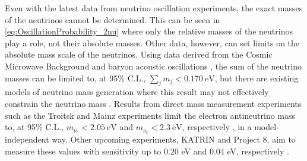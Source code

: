 Even with the latest data from neutrino oscillation experiments, the exact masses of the neutrinos cannot be determined.
This can be seen in \autoref{eq:OscillationProbability_2nu} where only the relative masses of the neutrinos play a role, not their absolute masses. 
Other data, however, can set limits on the absolute mass scale of the neutrinos.
Using data derived from the Cosmic Microwave Background and baryon acoustic oscillations \cite{refId0}, the sum of the neutrino masses can be limited to, at 95\% C.L., $\sum_j m_j < 0.170~\textrm{eV}$, but there are existing models of neutrino mass generation where this result may not effectively constrain the neutrino mass \cite{Koksbang:2017rux} \cite{PhysRevLett.94.111801}.
Results from direct mass measurement experiments such as the Troitsk and Mainz experiments limit the electron antineutrino mass to, at 95\% C.L., $m_{\bar{\nu}_e} < 2.05~\textrm{eV}$ and $m_{\bar{\nu}_e} < 2.3~\textrm{eV}$, respectively \cite{Aseev:2011dq} \cite{Kraus:2004zw}, in a model-independent way.
Other upcoming experiments, KATRIN and Project 8, aim to measure these values with sensitivity up to 0.20 eV  and 0.04 eV, respectively \cite{Robertson:2013ziv} \cite{Esfahani:2017dmu}.

